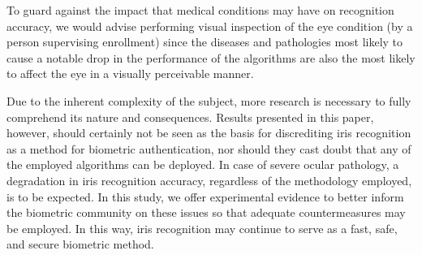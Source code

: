 \documentclass[article,12pt]{elsarticle}
\begin{document}
To guard against the impact that medical conditions may have on recognition accuracy, we would advise performing visual inspection of the eye condition (by a person supervising enrollment) since the diseases and pathologies most likely to cause a notable drop in the performance of the algorithms are also the most likely to affect the eye in a visually perceivable manner.

Due to the inherent complexity of the subject, more research is necessary to fully comprehend its nature and consequences. Results presented in this paper, however, should certainly not be seen as the basis for discrediting iris recognition as a method for biometric authentication, nor should they cast doubt that any of the employed algorithms can be deployed. In case of severe ocular pathology, a degradation in iris recognition accuracy, regardless of the methodology employed, is to be expected. In this study, we offer experimental evidence to better inform the biometric community on these issues so that adequate countermeasures may be employed. In this way, iris recognition may continue to serve as a fast, safe, and secure biometric method.



\section*{\refname}
\small

\end{document}
